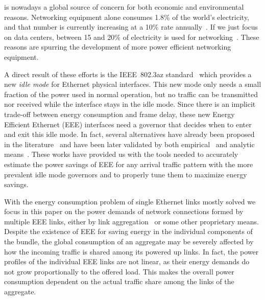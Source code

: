 \documentclass[journal,english,twocolumn,10pt,letterpaper]{IEEEtran}
\newcommand{\added}[1]{{#1}}
\begin{document}
 is nowadays a global source of concern for
both economic and environmental reasons. Networking equipment alone consumes
1.8\% of the world's electricity, and that number is currently increasing at a
10\% rate annually~\cite{lambert12:_world}. If we \added{just focus} on data
centers, between 15 and 20\% of electricity is used for
networking~\cite{heller10:_elast}. These reasons are spurring the development
of more power efficient networking equipment.

A direct result of these efforts is the IEEE~802.3az standard~\cite{802.3az}
which provides a new \emph{idle mode} for Ethernet physical interfaces. This
new mode only needs a small fraction of the power used in normal operation,
but no traffic can be transmitted nor received while the interface stays in
the idle mode. Since there is an implicit trade-off between energy consumption
and frame delay, these new Energy Efficient Ethernet (EEE) interfaces need a
governor that decides when to enter and exit this idle mode. In fact, several
alternatives have already been proposed in the
literature~\cite{gupta07:_using_low_power_modes_for,rodriguez09:_improv_oppor_sleep_algor_lan_switc,reviriego10:_burst_tx_eee,christensen10:_the_road_to_eee}
and have been later validated by both
empirical~\cite{reviriego09:_perf_eval_eee,reviriego11:_initial_evaluat_energ_effic_ether}
and analytic
means~\cite{herreria11:_oppor_ether,herreria11:_power_savin_model_burst_trans,marsan11:_simpl_analy_model_energ_effic_ether,herreria12:_gi_g_model_gb_energ_effic_ether,aksic14:_packet_ether}.
These works have provided us with the tools needed to accurately estimate the
power savings of EEE for any arrival traffic pattern with the more prevalent
idle mode governors and to properly tune them to maximize energy savings.

With the energy consumption problem of single Ethernet links mostly solved we
focus in this paper on the power demands of network connections formed by
multiple EEE links, either by link aggregation~\cite{ieee_std_802.1ax} or some
other proprietary means. Despite the existence of EEE for saving energy in the
individual components of the bundle, the global consumption of an aggregate
may be severely affected by how the incoming traffic is shared among its
powered up links. \added{In fact, the power profiles of the individual EEE links are
not linear, as their energy demands do not grow proportionally to the offered
load. This makes the overall power consumption dependent on the actual traffic
share among the links of the aggregate.
}
\end{document}
